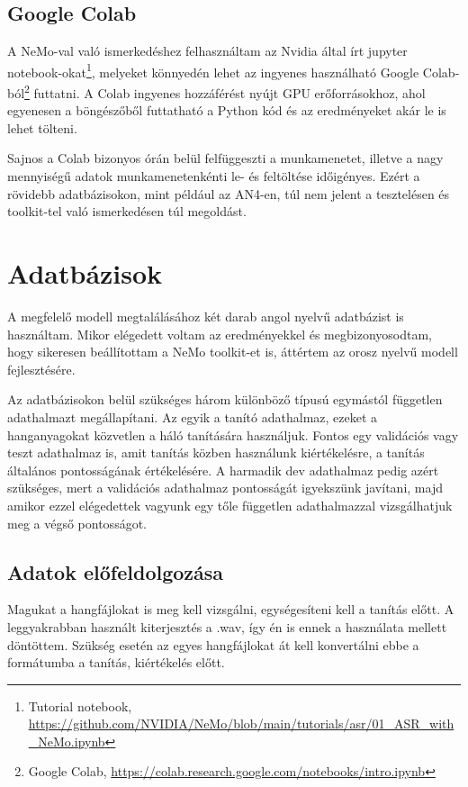 \subsection{Google Colab}

A NeMo-val való ismerkedéshez felhasználtam az Nvidia által írt jupyter notebook-okat\footnote{Tutorial notebook, \url{https://github.com/NVIDIA/NeMo/blob/main/tutorials/asr/01_ASR_with_NeMo.ipynb}}, melyeket könnyedén lehet az ingyenes használható Google Colab-ból\footnote{Google Colab, \url{https://colab.research.google.com/notebooks/intro.ipynb}} futtatni. A Colab ingyenes hozzáférést nyújt GPU erőforrásokhoz, ahol egyenesen a böngészőből futtatható a Python kód és az eredményeket akár le is lehet tölteni.

Sajnos a Colab bizonyos órán belül felfüggeszti a munkamenetet, illetve a nagy mennyiségű adatok munkamenetenkénti le- és feltöltése időigényes. Ezért a rövidebb adatbázisokon, mint például az AN4-en, túl nem jelent a tesztelésen és toolkit-tel való ismerkedésen túl megoldást.

\section{Adatbázisok}

A megfelelő modell megtalálásához két darab angol nyelvű adatbázist is használtam. Mikor elégedett voltam az eredményekkel és megbizonyosodtam, hogy sikeresen beállítottam a NeMo toolkit-et is, áttértem az orosz nyelvű modell fejlesztésére.

Az adatbázisokon belül szükséges három különböző típusú egymástól független adathalmazt megállapítani. Az egyik a tanító adathalmaz, ezeket a hanganyagokat közvetlen a háló tanítására használjuk. Fontos egy validációs vagy teszt adathalmaz is, amit tanítás közben használunk kiértékelésre, a tanítás általános pontosságának értékelésére. A harmadik dev adathalmaz pedig azért szükséges, mert a validációs adathalmaz pontosságát igyekszünk javítani, majd amikor ezzel elégedettek vagyunk egy tőle független adathalmazzal vizsgálhatjuk meg a végső pontosságot.

\subsection{Adatok előfeldolgozása}

Magukat a hangfájlokat is meg kell vizsgálni, egységesíteni kell a tanítás előtt. A leggyakrabban használt kiterjesztés a .wav, így én is ennek a használata mellett döntöttem. Szükség esetén az egyes hangfájlokat át kell konvertálni ebbe a formátumba a tanítás, kiértékelés előtt.

